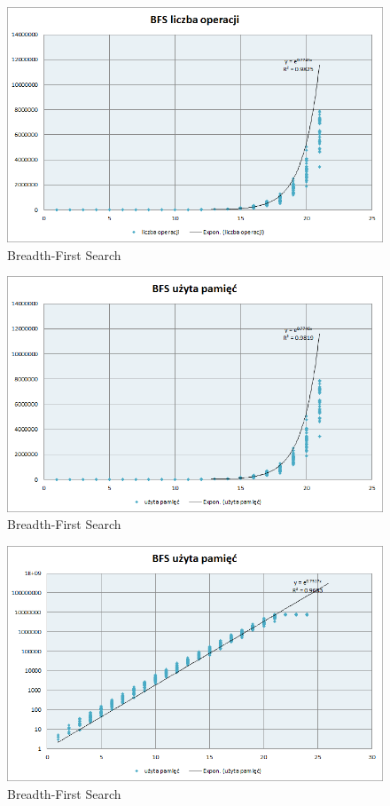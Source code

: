 \documentclass{classrep}
\begin{document}
\begin{figure}[ht]
\centering
			\includegraphics[scale=0.65]{pictures/BFS_operacje_exp.png}
	\caption{Breadth-First Search}
	\label{fig:Breadth-First Search}
\end{figure}

\begin{figure}[ht]
\centering
			\includegraphics[scale=0.65]{pictures/BFS_pamiec_exp.png}
	\caption{Breadth-First Search}
	\label{fig:Breadth-First Search}
\end{figure}

\begin{figure}[ht]
\centering
			\includegraphics[scale=0.65]{pictures/BFS_pamiec_log.png}
	\caption{Breadth-First Search}
	\label{fig:Breadth-First Search}
\end{figure}
\end{document}
